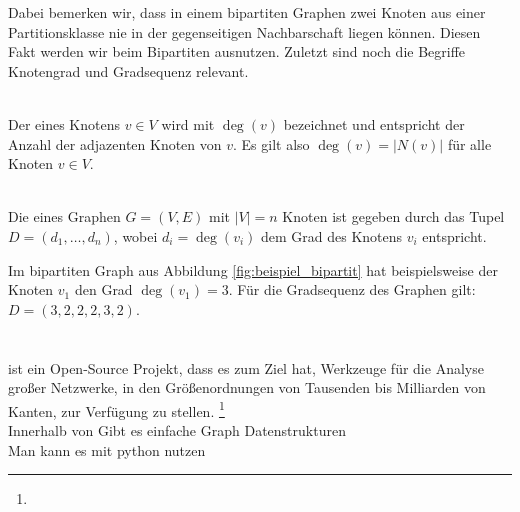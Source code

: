 Dabei bemerken wir, dass in einem bipartiten Graphen zwei Knoten aus einer Partitionsklasse nie
in der gegenseitigen Nachbarschaft liegen können. Diesen Fakt werden wir beim Bipartiten \gc{} ausnutzen.
Zuletzt sind noch die Begriffe Knotengrad und Gradsequenz relevant.
\begin{definition}[Knotengrad]~\\
Der  eines Knotens $v \in V$ wird mit $\deg(v)$ bezeichnet und entspricht der Anzahl
der adjazenten Knoten von $v$. Es gilt also $\deg(v) = |N(v)|$ für alle Knoten $v\in V$.
\end{definition}
\begin{definition}[Gradsequenz]~\\
Die  eines Graphen $G = (V,E)$ mit $|V| = n$ Knoten ist gegeben durch das Tupel
$D = (d_{1}, \dots, d_{n})$, wobei $d_{i} = \deg(v_{i})$ dem Grad des Knotens $v_{i}$ entspricht.
\end{definition}

Im bipartiten Graph aus Abbildung \ref{fig:beispiel_bipartit} hat beispielsweise
der Knoten $v_{1}$ den Grad $\deg(v_{1}) = 3$. Für die Gradsequenz des Graphen gilt: 
$D = (3,2,2,2,3,2)$.




\section{\nk}

 ist ein Open-Source Projekt, dass es zum Ziel hat, \glqq Werkzeuge für die
Analyse großer Netzwerke, in den Größenordnungen von Tausenden bis Milliarden 
von Kanten, zur Verfügung zu stellen\grqq.
\footnote{}
\\
Innerhalb von \nk Gibt es einfache Graph Datenstrukturen 
\\
Man kann es mit python nutzen 




